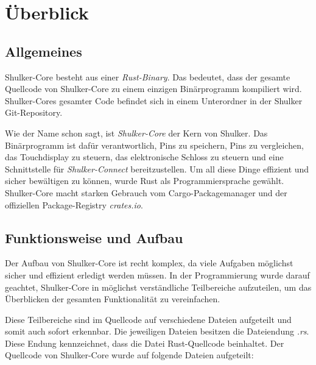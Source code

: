 \lstset{language=rust}
\chapter{Überblick}
\section{Allgemeines}
Shulker-Core besteht aus einer \textit{Rust-Binary}. Das bedeutet, dass der gesamte Quellcode von Shulker-Core zu einem einzigen
Binärprogramm kompiliert wird. Shulker-Cores gesamter Code befindet sich in einem Unterordner in der Shulker Git-Repository.

Wie der Name schon sagt, ist \textit{Shulker-Core} der Kern von Shulker. Das Binärprogramm ist dafür verantwortlich,
Pins zu speichern, Pins zu vergleichen, das Touchdisplay zu steuern, das elektronische Schloss zu steuern und eine Schnittstelle
für \textit{Shulker-Connect} bereitzustellen. Um all diese Dinge effizient und sicher bewältigen zu können, wurde Rust als
Programmiersprache gewählt. Shulker-Core macht starken Gebrauch vom Cargo-Packagemanager und der offiziellen Package-Registry \textit{crates.io}.

\section{Funktionsweise und Aufbau}
Der Aufbau von Shulker-Core ist recht komplex, da viele Aufgaben möglichst sicher und effizient erledigt werden müssen.
In der Programmierung wurde darauf geachtet, Shulker-Core in möglichst verständliche Teilbereiche aufzuteilen, um das Überblicken
der gesamten Funktionalität zu vereinfachen.

Diese Teilbereiche sind im Quellcode auf verschiedene Dateien aufgeteilt und somit auch sofort erkennbar. Die jeweiligen Dateien besitzen die
Dateiendung \textit{.rs}. Diese Endung kennzeichnet, dass die Datei Rust-Quellcode beinhaltet. Der Quellcode von Shulker-Core wurde
auf folgende Dateien aufgeteilt:

